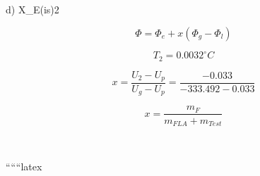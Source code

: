 d) \quad X_{E(is)2}

\[
\Phi = \Phi_e + x \left( \Phi_g - \Phi_l \right)
\]

\[
T_2 = 0.0032^\circ C
\]

\[
x = \frac{U_2 - U_p}{U_g - U_p} = \frac{-0.033}{-333.492 - 0.033}
\]

\[
x = \frac{m_F}{m_{FLA} + m_{Test}}
\]

\quad {} \\
\quad {}

``````latex